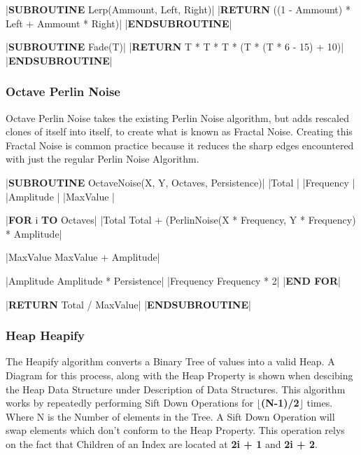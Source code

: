 \begin{flushleft}
\begin{pseudocode}
|\textbf{SUBROUTINE} Lerp(Ammount, Left, Right)|
    |\textbf{RETURN} ((1 - Ammount) * Left + Ammount * Right)|
|\textbf{ENDSUBROUTINE}|

|\textbf{SUBROUTINE} Fade(T)|
    |\textbf{RETURN} T * T * T * (T * (T * 6 - 15) + 10)|
|\textbf{ENDSUBROUTINE}|
                \end{pseudocode}

                \vspace{0.5cm}
            \subsubsection{Octave Perlin Noise}
                Octave Perlin Noise takes the existing Perlin Noise algorithm, but adds rescaled clones of itself into itself, to create
                what is known as Fractal Noise. Creating this Fractal Noise is common practice because it reduces the sharp edges encountered
                with just the regular Perlin Noise Algorithm.

                \vspace{0.2cm}
                \begin{pseudocode}
|\textbf{SUBROUTINE} OctaveNoise(X, Y, Octaves, Persistence)|
    |Total |
    |Frequency |
    |Amplitude |
    |MaxValue |

    |\textbf{FOR} i  \textbf{TO} Octaves|
        |Total \leftarrow Total + (PerlinNoise(X * Frequency, Y * Frequency) * Amplitude|

        |MaxValue \leftarrow MaxValue + Amplitude|

        |Amplitude \leftarrow Amplitude * Persistence|
        |Frequency \leftarrow Frequency * 2|
    |\textbf{END FOR}|

    |\textbf{RETURN} Total / MaxValue|
|\textbf{ENDSUBROUTINE}|            
                \end{pseudocode}
            \subsubsection{Heap Heapify}
                The Heapify algorithm converts a Binary Tree of values into a valid Heap. A Diagram for this process, along with the Heap Property is shown when descibing the Heap 
                Data Structure under Description of Data Structures. This algorithm works by repeatedly performing Sift Down Operations for \textbf{$\lfloor$(N-1)/2$\rfloor$} times.
                Where N is the Number of elements in the Tree. A Sift Down Operation will swap elements which don't conform to the Heap Property.
                This operation relys on the fact that Children of an Index are located at \textbf{2i + 1} and \textbf{2i + 2}.
                \vspace{0.2cm}


\end{flushleft}
